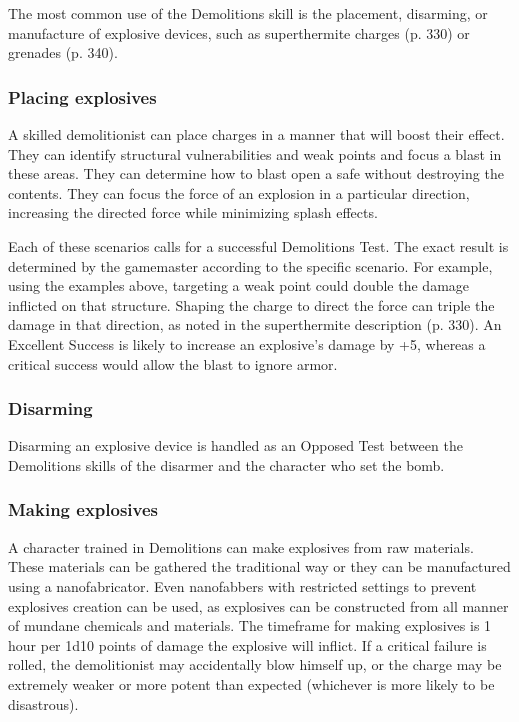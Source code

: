 The most common use of the Demolitions skill is the placement, disarming, or manufacture of explosive devices, such as superthermite charges (p. 330) or grenades (p. 340).

\subsubsection{Placing explosives}

A skilled demolitionist can place charges in a manner that will boost their effect. They can identify structural vulnerabilities and weak points and focus a blast in these areas. They can determine how to blast open a safe without destroying the contents. They can focus the force of an explosion in a particular direction, increasing the directed force while minimizing splash effects.

Each of these scenarios calls for a successful Demolitions Test. The exact result is determined by the gamemaster according to the specific scenario. For example, using the examples above, targeting a weak point could double the damage inflicted on that structure. Shaping the charge to direct the force can triple the damage in that direction, as noted in the superthermite description (p. 330). An Excellent Success is likely to increase an explosive’s damage by +5, whereas a critical success would allow the blast to ignore armor.

\subsubsection{Disarming}

Disarming an explosive device is handled as an Opposed Test between the Demolitions skills of the disarmer and the character who set the bomb.


\subsubsection{Making explosives}

A character trained in Demolitions can make explosives from raw materials. These materials can be gathered the traditional way or they can be manufactured using a nanofabricator. Even nanofabbers with restricted settings to prevent explosives creation can be used, as explosives can be constructed from all manner of mundane chemicals and materials. The timeframe for making explosives is 1 hour per 1d10 points of damage the explosive will inflict. If a critical failure is rolled, the demolitionist may accidentally blow himself up, or the charge may be extremely weaker or more potent than expected (whichever is more likely to be disastrous).


